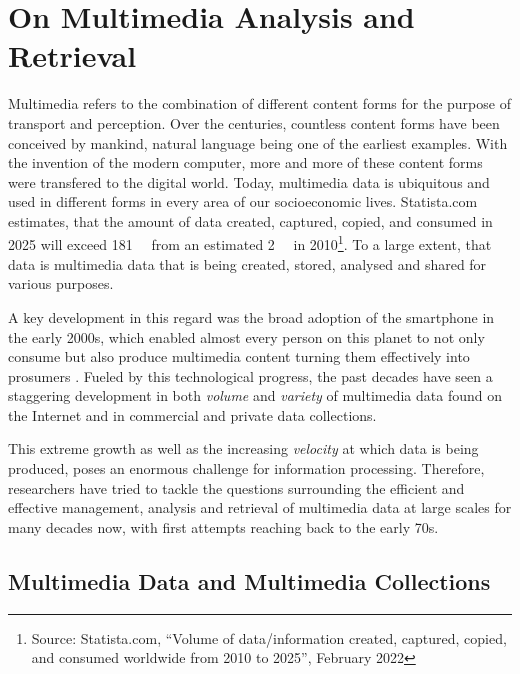 \chapter{On Multimedia Analysis and Retrieval}
\label{chapter:theory_multimedia_analysis_and_retrieval}

Multimedia refers to the combination of different content forms for the purpose of transport and perception. Over the centuries, countless content forms have been conceived by mankind, natural language being one of the earliest examples. With the invention of the modern computer, more and more of these content forms were transfered to the digital world. Today, multimedia data is ubiquitous and used in different forms in every area of our socioeconomic lives. Statista.com estimates, that the amount of data created, captured, copied, and consumed in 2025 will exceed \SI{181}{\zetta\byte} from an estimated \SI{2}{\zetta\byte} in 2010\footnote{Source: Statista.com, ``Volume of data/information created, captured, copied, and consumed worldwide from 2010 to 2025'', February 2022}. To a large extent, that data is multimedia data that is being created, stored, analysed and shared for various purposes.

A key development in this regard was the broad adoption of the smartphone in the early 2000s, which enabled almost every person on this planet to not only consume but also produce multimedia content turning them effectively into prosumers \cite{Ritzer:2010Production,Ritzer2012:Coming}. Fueled by this technological progress, the past decades have seen a staggering development in both \emph{volume} and \emph{variety} of multimedia data found on the Internet and in commercial and private data collections.

This extreme growth as well as the increasing \emph{velocity} at which data is being produced, poses an enormous challenge for information processing. Therefore, researchers have tried to tackle the questions surrounding the efficient and effective management, analysis and retrieval of multimedia data at large scales for many decades now, with first attempts reaching back to the early 70s.

\section{Multimedia Data and Multimedia Collections}
\label{section:multmedia_data}

